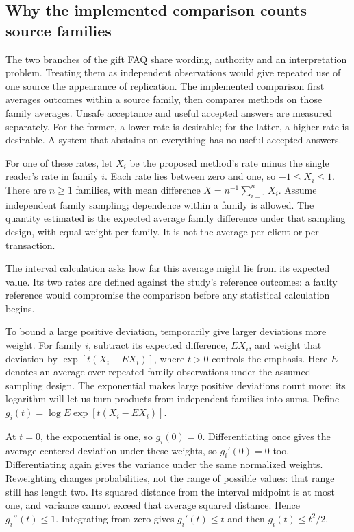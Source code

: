 \subsection{Why the implemented comparison counts source families}
\label{sec:family-comparison}

The two branches of the gift FAQ share wording, authority and an interpretation
problem. Treating them as independent observations would give repeated use of
one source the appearance of replication. The implemented comparison first
averages outcomes within a source family, then compares methods on those family
averages. Unsafe acceptance and useful accepted answers are measured separately.
For the former, a lower rate is desirable; for the latter, a higher rate is
desirable. A system that abstains on everything has no useful accepted answers.

For one of these rates, let $X_i$ be the proposed method's rate minus the single
reader's rate in family $i$. Each rate lies between zero and one, so
$-1\leq X_i\leq1$. There are $n\geq1$ families, with mean difference
$\bar X=n^{-1}\sum_{i=1}^{n}X_i$. Assume independent family sampling; dependence
within a family is allowed. The quantity estimated is the expected average
family difference under that sampling design, with equal weight per family.
It is not the average per client or per transaction.

The interval calculation asks how far this average might lie from its expected
value. Its two rates are defined against the study's reference outcomes: a
faulty reference would compromise the comparison before any statistical
calculation begins.

To bound a large positive deviation, temporarily give larger deviations more
weight. For family $i$, subtract its expected difference, $E X_i$, and weight
that deviation by $\exp[t(X_i-E X_i)]$, where $t>0$ controls the emphasis.
Here $E$ denotes an average over repeated family observations under the assumed
sampling design. The exponential makes large positive deviations count more;
its logarithm will let us turn products from independent families into sums.
Define $g_i(t)=\log E\exp[t(X_i-E X_i)]$.

At $t=0$, the exponential is one, so $g_i(0)=0$. Differentiating once gives the
average centered deviation under these weights, so $g_i'(0)=0$ too.
Differentiating again gives the variance under the same normalized weights.
Reweighting changes probabilities, not the range of possible values: that range
still has length two. Its squared distance from the interval midpoint is at
most one, and variance cannot exceed that average squared distance. Hence
$g_i''(t)\leq1$. Integrating from zero gives $g_i'(t)\leq t$ and then
$g_i(t)\leq t^2/2$.

